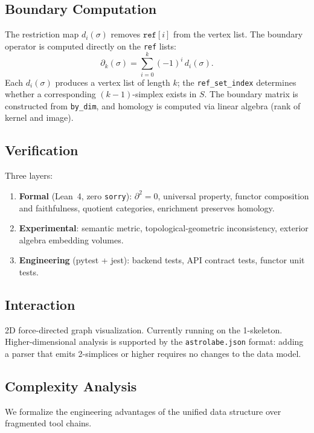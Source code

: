 \subsection{Boundary Computation}

The restriction map $d_i(\sigma)$ removes $\texttt{ref}[i]$ from the vertex list. The boundary operator is computed directly on the \texttt{ref} lists:
\[
\partial_k(\sigma) = \sum_{i=0}^{k} (-1)^i \, d_i(\sigma).
\]
Each $d_i(\sigma)$ produces a vertex list of length $k$; the \texttt{ref\_set\_index} determines whether a corresponding $(k-1)$-simplex exists in $S$. The boundary matrix is constructed from \texttt{by\_dim}, and homology is computed via linear algebra (rank of kernel and image).

\subsection{Verification}

Three layers:
\begin{enumerate}
\item \textbf{Formal} (Lean~4, zero \texttt{sorry}): $\partial^2 = 0$, universal property, functor composition and faithfulness, quotient categories, enrichment preserves homology.
\item \textbf{Experimental}: semantic metric, topological-geometric inconsistency, exterior algebra embedding volumes.
\item \textbf{Engineering} (pytest + jest): backend tests, API contract tests, functor unit tests.
\end{enumerate}

\subsection{Interaction}

2D force-directed graph visualization. Currently running on the 1-skeleton. Higher-dimensional analysis is supported by the \texttt{astrolabe.json} format: adding a parser that emits 2-simplices or higher requires no changes to the data model.

\subsection{Complexity Analysis}

We formalize the engineering advantages of the unified data structure over fragmented tool chains.

